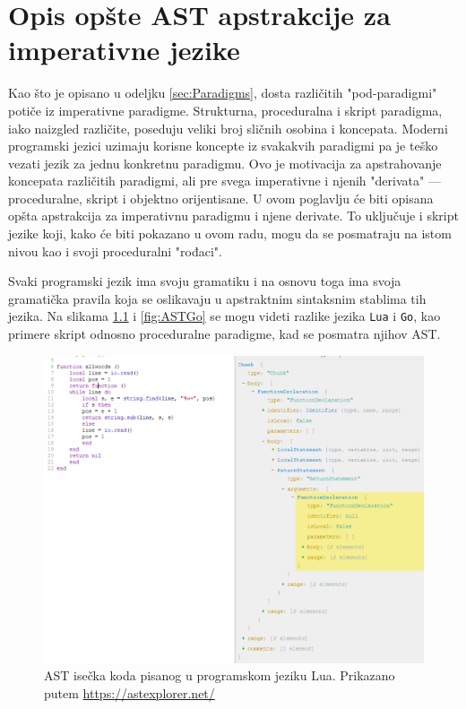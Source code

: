 \chapter{Opis opšte AST apstrakcije za imperativne jezike}
\label{chp:MyAST}

Kao što je opisano u odeljku \ref{sec:Paradigms}, dosta različitih "pod-paradigmi" potiče iz imperativne paradigme. Strukturna, proceduralna i skript paradigma, iako naizgled različite, poseduju veliki broj sličnih osobina i koncepata. Moderni programski jezici uzimaju korisne koncepte iz svakakvih paradigmi pa je teško vezati jezik za jednu konkretnu paradigmu. Ovo je motivacija za apstrahovanje koncepata različitih paradigmi, ali pre svega imperativne i njenih "derivata" --- proceduralne, skript i objektno orijentisane. U ovom poglavlju će biti opisana opšta apstrakcija za imperativnu paradigmu i njene derivate. To uključuje i skript jezike koji, kako će biti pokazano u ovom radu, mogu da se posmatraju na istom nivou kao i svoji proceduralni "rođaci".

Svaki programski jezik ima svoju gramatiku i na osnovu toga ima svoja gramatička pravila koja se oslikavaju u apstraktnim sintaksnim stablima tih jezika. Na slikama \ref{fig:ASTLua} i \ref{fig:ASTGo} se mogu videti razlike jezika \texttt{Lua} i \texttt{Go}, kao primere skript odnosno proceduralne paradigme, kad se posmatra njihov AST.

\begin{figure}[h!]
\centering
\includegraphics[scale=0.6]{images/ast_lua.png}
\caption{AST isečka koda pisanog u programskom jeziku Lua. Prikazano putem \url{https://astexplorer.net/}}
\label{fig:ASTLua}
\end{figure}

